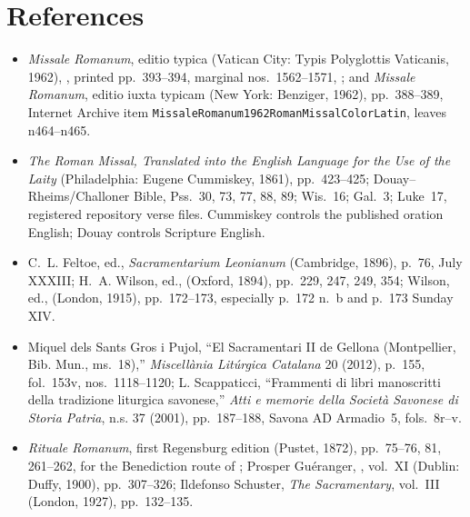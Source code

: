 \clearpage
\section*{References}

{\fontsize{7.05}{7.45}\selectfont
\begin{itemize}[itemsep=0em,topsep=0.15em,parsep=0pt]
\item \emph{Missale Romanum}, editio typica (Vatican City: Typis
Polyglottis Vaticanis, 1962), , printed pp.~393--394, marginal nos.~1562--1571,
;
and \emph{Missale Romanum}, editio iuxta typicam (New York: Benziger, 1962),
pp.~388--389, Internet Archive item
\texttt{MissaleRomanum1962RomanMissalColorLatin}, leaves n464--n465.

\item \emph{The Roman Missal, Translated into the English Language for the
Use of the Laity} (Philadelphia: Eugene Cummiskey, 1861), pp.~423--425;
Douay--Rheims/Challoner Bible, Pss.~30, 73, 77, 88, 89; Wis.~16; Gal.~3;
Luke~17, registered repository verse files. Cummiskey controls the published
oration English; Douay controls Scripture English.

\item C.~L. Feltoe, ed., \emph{Sacramentarium Leonianum} (Cambridge, 1896),
p.~76, July XXXIII; H.~A. Wilson, ed.,
 (Oxford, 1894), pp.~229, 247, 249, 354; Wilson, ed.,
 (London, 1915), pp.~172--173,
especially p.~172 n.~b and p.~173 Sunday XIV.

\item Miquel dels Sants Gros i Pujol, ``El Sacramentari II de Gellona
(Montpellier, Bib. Mun., ms.~18),'' \emph{Miscel\textperiodcentered lània
Litúrgica Catalana} 20 (2012), p.~155, fol.~153v, nos.~1118--1120;
L. Scappaticci, ``Frammenti di libri manoscritti della tradizione liturgica
savonese,'' \emph{Atti e memorie della Società Savonese di Storia Patria},
n.s. 37 (2001), pp.~187--188, Savona AD Armadio~5, fols.~8r--v.

\item \emph{Rituale Romanum}, first Regensburg edition (Pustet, 1872),
pp.~75--76, 81, 261--262, for the Benediction route of
; Prosper Guéranger,
, vol.~XI (Dublin: Duffy, 1900), pp.~307--326; Ildefonso Schuster,
\emph{The Sacramentary}, vol.~III (London, 1927), pp.~132--135.


\end{itemize}}
